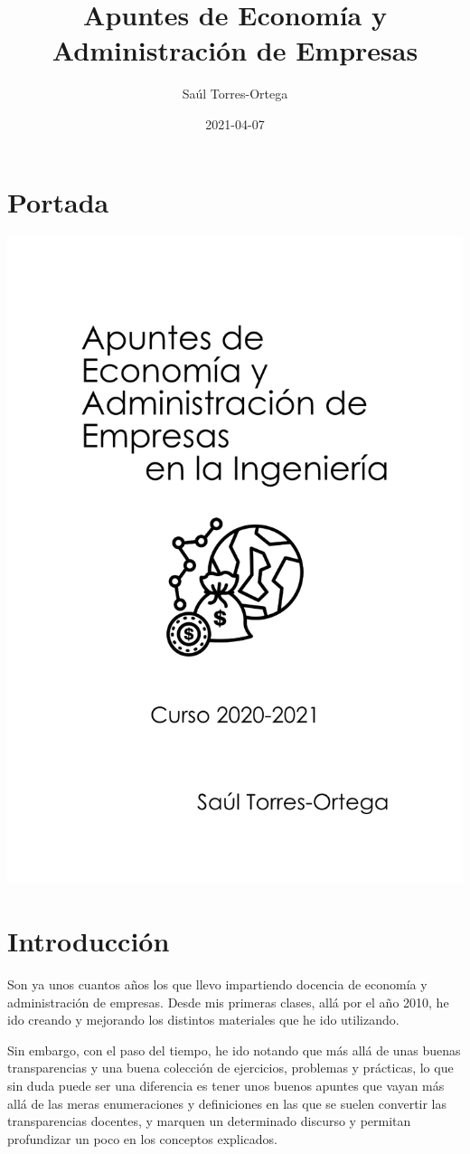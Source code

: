 \documentclass[
]{krantz}
\title{Apuntes de Economía y Administración de Empresas}
\author{Saúl Torres-Ortega}
\date{2021-04-07}
\begin{document}
\maketitle

{
\setcounter{tocdepth}{2}
\tableofcontents
}
\hypertarget{portada}{%
\chapter*{Portada}\label{portada}}


\begin{center}\includegraphics[width=0.5\linewidth]{images/portada-01} \end{center}

\hypertarget{introducciuxf3n}{%
\chapter*{Introducción}\label{introducciuxf3n}}


Son ya unos cuantos años los que llevo impartiendo docencia de economía y administración de empresas. Desde mis primeras clases, allá por el año 2010, he ido creando y mejorando los distintos materiales que he ido utilizando.

Sin embargo, con el paso del tiempo, he ido notando que más allá de unas buenas transparencias y una buena colección de ejercicios, problemas y prácticas, lo que sin duda puede ser una diferencia es tener unos buenos apuntes que vayan más allá de las meras enumeraciones y definiciones en las que se suelen convertir las transparencias docentes, y marquen un determinado discurso y permitan profundizar un poco en los conceptos explicados.
\end{document}
